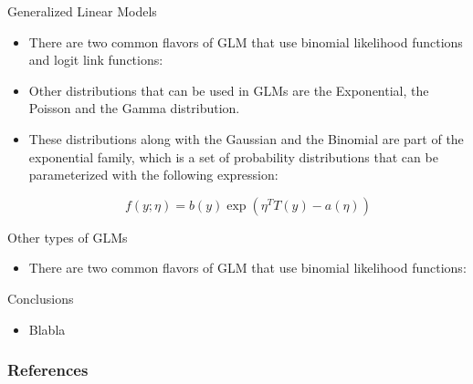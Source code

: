 \documentclass[handout]{beamer}
\begin{document}
\begin{frame}{Generalized Linear Models}
\scriptsize{
\begin{itemize}

\item There are two common flavors of GLM that use binomial likelihood functions and logit link functions:


\item Other distributions that can be used in GLMs are the Exponential, the Poisson and the Gamma distribution.

\item These distributions along with the Gaussian and the Binomial are part of the exponential family, which is a set of probability distributions that can be parameterized with the following expression:

\begin{equation}
f(y;\eta)=b(y)\exp(\eta^T T(y)-a(\eta))
\end{equation}


\end{itemize}


}

\end{frame}


\begin{frame}{Other types of GLMs}
\scriptsize{
\begin{itemize}

\item There are two common flavors of GLM that use binomial likelihood functions:

\end{itemize}


}

\end{frame}


\begin{frame}{Conclusions}
\scriptsize{

\begin{itemize}
\item Blabla
\end{itemize}


} 
\end{frame}


\begin{frame}[allowframebreaks]\scriptsize
\frametitle{References}


%
\end{frame}  









\end{document}
